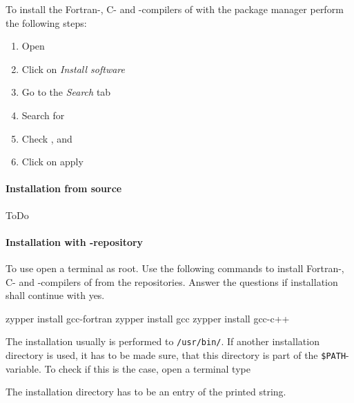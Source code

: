 To install the Fortran-, C- and \Cpp-compilers of \marktool[\gccaddress]{\gccname} with the package manager perform the following steps:

\begin{enumerate}[itemsep=-1.5ex]
 \item Open \marktool{\yastname}
 \item Click on \textit{Install software}
 \item Go to the \textit{Search} tab
 \item Search for \gccname
 \item Check ,  and 
 \item Click on apply
\end{enumerate}

\paragraph{Installation from source}

ToDo

\paragraph{Installation with \marktool{\opensusename}-repository}

To use \marktool{\zyppername} open a terminal as root. Use the following commands to install Fortran-, C- and \Cpp-compilers of \marktool[\gccaddress]{\gccname} from the repositories. Answer the questions if installation shall continue with yes.

\begin{code}
zypper install gcc-fortran
zypper install gcc
zypper install gcc-c++
\end{code}

The installation usually is performed to \verb+/usr/bin/+. If another installation directory is used, it has to be made sure, that this directory is part of the \verb+$PATH+-variable. To check if this is the case, open a terminal type


The installation directory has to be an entry of the printed string.